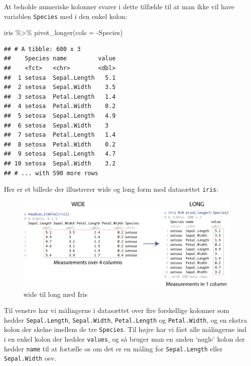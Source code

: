 \documentclass[
]{book}
\newenvironment{Shaded}{\begin{snugshade}}{\end{snugshade}}
\newcommand{\AttributeTok}[1]{\textcolor[rgb]{0.77,0.63,0.00}{#1}}
\newcommand{\FunctionTok}[1]{\textcolor[rgb]{0.00,0.00,0.00}{#1}}
\newcommand{\NormalTok}[1]{#1}
\newcommand{\SpecialCharTok}[1]{\textcolor[rgb]{0.00,0.00,0.00}{#1}}
\begin{document}
At beholde numeriske kolonner svarer i dette tilfælde til at man ikke vil have variablen \texttt{Species} med i den enkel kolon:

\begin{Shaded}
\begin{Highlighting}[]
\NormalTok{iris }\SpecialCharTok{\%\textgreater{}\%} 
  \FunctionTok{pivot\_longer}\NormalTok{(}\AttributeTok{cols =} \SpecialCharTok{{-}}\NormalTok{Species)}
\end{Highlighting}
\end{Shaded}

\begin{verbatim}
## # A tibble: 600 x 3
##    Species name         value
##    <fct>   <chr>        <dbl>
##  1 setosa  Sepal.Length   5.1
##  2 setosa  Sepal.Width    3.5
##  3 setosa  Petal.Length   1.4
##  4 setosa  Petal.Width    0.2
##  5 setosa  Sepal.Length   4.9
##  6 setosa  Sepal.Width    3  
##  7 setosa  Petal.Length   1.4
##  8 setosa  Petal.Width    0.2
##  9 setosa  Sepal.Length   4.7
## 10 setosa  Sepal.Width    3.2
## # ... with 590 more rows
\end{verbatim}

Her er et billede der illustrerer wide og long form med datasættet \texttt{iris}:

\begin{figure}
\includegraphics[width=1\linewidth]{plots/wide_to_long} \caption{wide til long med Iris}\label{fig:unnamed-chunk-304}
\end{figure}

Til venstre har vi målingerne i datasættet over fire forskellige kolonner som hedder \texttt{Sepal.Length}, \texttt{Sepal.Width}, \texttt{Petal.Length} og \texttt{Petal.Width}, og en ekstra kolon der skelne imellem de tre \texttt{Species}. Til højre har vi fået alle målingerne ind i en enkel kolon der hedder \texttt{values}, og så bruger man en anden `nøgle' kolon der hedder \texttt{name} til at fortælle os om det er en måling for \texttt{Sepal.Length} eller \texttt{Sepal.Width} osv.
\end{document}
